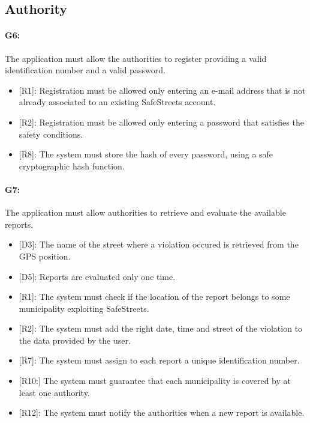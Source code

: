 \documentclass[12pt,a4paper]{report}
\begin{document}
		\subsection{Authority}
			
			\paragraph {G6:} The application must allow the authorities to register providing a valid identification number and a valid password.
				\begin{itemize}
					\item{[R1]:} Registration must be allowed only entering an e-mail address that is not already associated to an existing SafeStreets account.
					\item{[R2]:} Registration must be allowed only entering a password that satisfies the safety conditions.
					\item{[R8]:} The system must store the hash of every password, using a safe cryptographic hash function.
				\end{itemize}

			\paragraph {G7:} The application must allow authorities to retrieve and evaluate the available reports.
				\begin{itemize}
					\item{[D3]:} The name of the street where a violation occured is retrieved from the GPS position.
					\item{[D5]:} Reports are evaluated only one time.
				\end{itemize}
				\begin{itemize}
					\item{[R1]:} The system must check if the location of the report belongs to some municipality exploiting SafeStreets.
					\item{[R2]:} The system must add the right date, time and street of the violation to the data provided by the user.
					\item{[R7]:} The system must assign to each report a unique identification number.
					\item{[R10:]} The system must guarantee that each municipality is covered by at least one authority.
					\item{[R12]:} The system must notify the authorities when a new report is available.
				\end{itemize}
\end{document}
